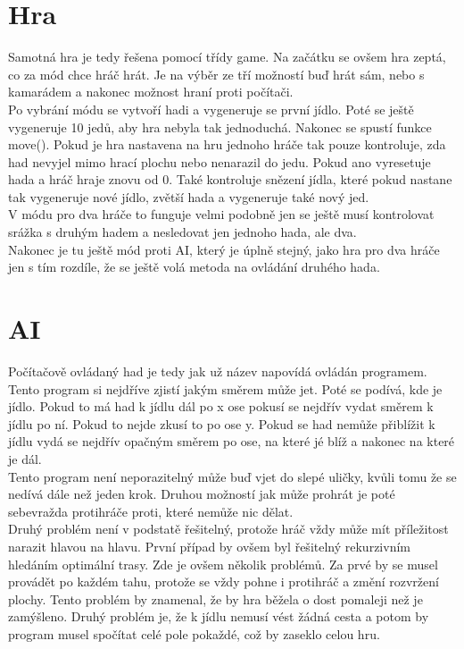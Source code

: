 \documentclass[a4paper,12pt]{report}
\begin{document}
\section{Hra}
Samotná hra je tedy řešena pomocí třídy game. Na začátku se ovšem hra zeptá, co za mód chce hráč hrát. Je na výběr ze tří možností buď hrát sám, nebo s kamarádem a nakonec možnost hraní proti počítači.\\
Po vybrání módu se vytvoří hadi a vygeneruje se první jídlo. Poté se ještě vygeneruje 10 jedů, aby hra nebyla tak jednoduchá. Nakonec se spustí funkce move(). Pokud je hra nastavena na hru jednoho hráče tak pouze kontroluje, zda had nevyjel mimo hrací plochu nebo nenarazil do jedu. Pokud ano vyresetuje hada a hráč hraje znovu od 0. Také kontroluje snězení jídla, které pokud nastane tak vygeneruje nové jídlo, zvětší hada a vygeneruje také nový jed.\\
V módu pro dva hráče to funguje velmi podobně jen se ještě musí kontrolovat srážka s druhým hadem a nesledovat jen jednoho hada, ale dva.\\
Nakonec je tu ještě mód proti AI, který je úplně stejný, jako hra pro dva hráče jen s tím rozdíle, že se ještě volá metoda na ovládání druhého hada.
\section{AI}
Počítačově ovládaný had je tedy jak už název napovídá ovládán programem. Tento program si nejdříve zjistí jakým směrem může jet. Poté se podívá, kde je jídlo. Pokud to má had k jídlu dál po x ose pokusí se nejdřív vydat směrem k jídlu po ní. Pokud to nejde zkusí to po ose y. Pokud se had nemůže přiblížit k jídlu vydá se nejdřív opačným směrem po ose, na které jé blíž a nakonec na které je dál.\\
Tento program není neporazitelný může buď vjet do slepé uličky, kvůli tomu že se nedívá dále než jeden krok. Druhou možností jak může prohrát je poté sebevražda protihráče proti, které nemůže nic dělat.\\
Druhý problém není v podstatě řešitelný, protože hráč vždy může mít příležitost narazit hlavou na hlavu. První případ by ovšem byl řešitelný rekurzivním hledáním optimální trasy. Zde je ovšem několik problémů. Za prvé by se musel provádět po každém tahu, protože se vždy pohne i protihráč a změní rozvržení plochy. Tento problém by znamenal, že by hra běžela o dost pomaleji než je zamýšleno. Druhý problém je, že k jídlu nemusí vést žádná cesta a potom by program musel spočítat celé pole pokaždé, což by zaseklo celou hru.
\end{document}
